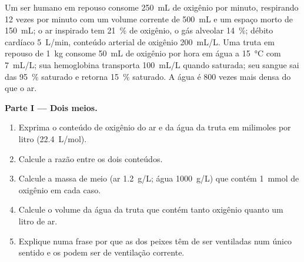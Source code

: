 \begin{problem}
\label{pb:b1:gas-exchange:1}
Um ser humano em repouso consome \qty{250}{mL} de oxigênio por minuto,
respirando \qty{12}{} vezes por minuto com um volume corrente de
\qty{500}{mL} e um espaço morto de \qty{150}{mL}; o ar inspirado tem
\qty{21}{\%} de oxigênio, o gás alveolar \qty{14}{\%}; débito cardíaco
\qty{5}{L/min}, conteúdo arterial de oxigênio \qty{200}{mL/L}. Uma
truta em repouso de \qty{1}{kg} consome \qty{50}{mL} de oxigênio por
hora em água a \qty{15}{\celsius} com \qty{7}{mL/L}; sua hemoglobina
transporta \qty{100}{mL/L} quando saturada; seu sangue sai das
 \qty{95}{\%} saturado e retorna \qty{15}{\%} saturado. A
água é \qty{800}{} vezes mais densa do que o ar.

\medskip
\noindent\textbf{Parte I --- Dois meios.}
\begin{enumerate}
  \item Exprima o conteúdo de oxigênio do ar e da água da truta em
        milimoles por litro (\qty{22.4}{L/mol}).
  \item Calcule a razão entre os dois conteúdos.
  \item Calcule a massa de meio (ar \qty{1.2}{g/L}; água
        \qty{1000}{g/L}) que contém \qty{1}{mmol} de oxigênio em cada
        caso.
  \item Calcule o volume da água da truta que contém tanto oxigênio
        quanto um litro de ar.
  \item Explique numa frase por que as  dos peixes têm de ser
        ventiladas num único sentido e os  podem ser de
        ventilação corrente.
\end{enumerate}


\end{problem}
